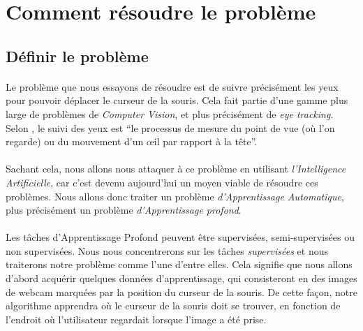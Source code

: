 \section{Comment résoudre le problème}
\subsection{Définir le problème}
\paragraph{}
Le problème que nous essayons de résoudre est de suivre précisément les yeux pour pouvoir déplacer le curseur de la souris.
Cela fait partie d'une gamme plus large de problèmes de \emph{Computer Vision}, et plus précisément de \emph{eye tracking}.
Selon \cite{eye_tracking}, le suivi des yeux est ``le processus de mesure du point de vue (où l'on regarde) ou du mouvement d'un œil par rapport à la tête''.
\paragraph{}
Sachant cela, nous allons nous attaquer à ce problème en utilisant \emph{l'Intelligence Artificielle}, car c'est devenu aujourd'hui un moyen viable de résoudre ces problèmes.
Nous allons donc traiter un problème \emph{d'Apprentissage Automatique}, plus précisément un problème \emph{d'Apprentissage profond}.
\paragraph{}
Les tâches d'Apprentissage Profond peuvent être supervisées, semi-supervisées ou non supervisées.
Nous nous concentrerons sur les tâches \emph{supervisées} et nous traiterons notre problème comme l'une d'entre elles.
Cela signifie que nous allons d'abord acquérir quelques données d'apprentissage, qui consisteront en des images de webcam marquées par la position du curseur de la souris.
De cette façon, notre algorithme apprendra où le curseur de la souris doit se trouver, en fonction de l'endroit où l'utilisateur regardait lorsque l'image a été prise.

